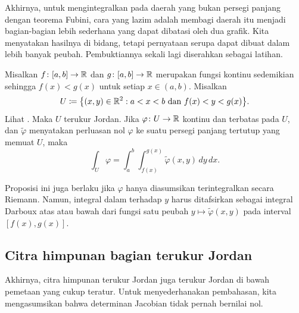 Akhirnya, untuk mengintegralkan pada daerah yang bukan persegi panjang dengan
teorema Fubini, cara yang lazim adalah membagi daerah itu menjadi bagian-bagian
lebih sederhana yang dapat dibatasi oleh dua grafik. Kita menyatakan hasilnya
di bidang, tetapi pernyataan serupa dapat dibuat dalam lebih banyak peubah.
Pembuktiannya sekali lagi diserahkan sebagai latihan.

\begin{prop} \label{prop:intovertypeIset}
Misalkan $f \colon [a,b] \to {\mathbb{R}}$ dan $g \colon [a,b] \to {\mathbb{R}}$ merupakan
fungsi kontinu sedemikian sehingga $f(x) < g(x)$ untuk setiap
$x \in (a,b)$. Misalkan
\begin{equation*}
U \coloneqq \bigl\{ (x,y) \in {\mathbb{R}}^2 : a < x < b \text{ dan } f(x) < y < g(x) \bigr\} .
\end{equation*}
Lihat .
Maka $U$ terukur Jordan. Jika $\varphi \colon U \to {\mathbb{R}}$ kontinu dan terbatas
pada $U$, dan $\widetilde{\varphi}$ menyatakan perluasan nol $\varphi$ ke suatu
persegi panjang tertutup yang memuat $U$, maka
\begin{equation*}
\int_U \varphi =
\int_a^b \int_{f(x)}^{g(x)} \widetilde{\varphi}(x,y) \, dy \, dx .
\end{equation*}
\end{prop}

Proposisi ini juga berlaku jika $\varphi$ hanya diasumsikan terintegralkan
secara Riemann. Namun, integral dalam terhadap $y$ harus ditafsirkan sebagai
integral Darboux atas atau bawah dari fungsi satu peubah
$y \mapsto \widetilde{\varphi}(x,y)$ pada interval $[f(x),g(x)]$.

\begin{myfigureht}
\caption{Daerah di antara dua grafik.\label{fig:typeIdomain}}
\end{myfigureht}

\subsection{Citra himpunan bagian terukur Jordan}

Akhirnya, citra himpunan terukur Jordan juga terukur Jordan di bawah
pemetaan yang cukup teratur.  Untuk menyederhanakan pembahasan, kita
mengasumsikan bahwa determinan Jacobian tidak pernah bernilai nol.

